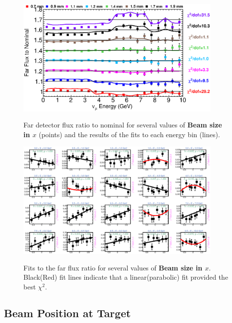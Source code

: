 \begin{figure}[ht]
  \begin{center}
    {\includegraphics[width=4.0in]{figures/BeamSigmaX_far_summary.eps}}
  \end{center}
\caption{ Far detector flux ratio to nominal for several values of {\bf Beam size in $x$} (points) and the results of the fits to each energy bin (lines).}
\end{figure}

\begin{figure}[hb]
  \begin{center}
    {\includegraphics[width=4.0in]{figures/BeamSigmaY_far_fits.eps}}
  \end{center}
\caption{ Fits to the far flux ratio for several values of {\bf Beam size in $x$}. Black(Red) fit lines indicate that a linear(parabolic) fit provided the best $\chi^2$. }
\end{figure}

\subsection{Beam Position at Target}

